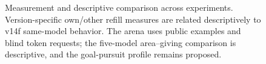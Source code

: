 \begin{figure}[!t]
\centering
\resizebox{\textwidth}{!}{}
\caption{Measurement and descriptive comparison across experiments. Version-specific own/other refill measures are related descriptively to v14f same-model behavior. The arena uses public examples and blind token requests; the five-model area--giving comparison is descriptive, and the goal-pursuit profile remains proposed.}
\label{fig:overview}
\end{figure}
